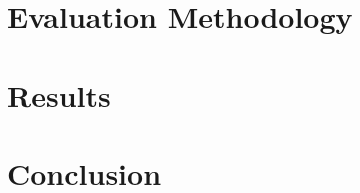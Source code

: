 \documentclass[letterpaper,twocolumn,10pt]{article}
\begin{document}
\section{Evaluation Methodology}



\section{Results}



\section{Conclusion}




\end{document}
